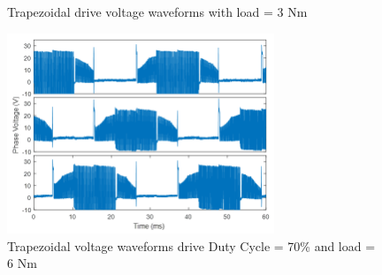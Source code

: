 \begin{figure}[h!p]
\centering

\caption{Trapezoidal drive voltage waveforms with load = 3 Nm}
\label{fig:trap_v3}
\end{figure}

\begin{figure}[h!p]
\centering
\includegraphics[width=8cm]{Images/waveforms/trap_9.png} 
\caption{Trapezoidal voltage waveforms drive Duty Cycle = 70\% and load = 6 Nm}
\label{fig:trap_v4}
\end{figure}

